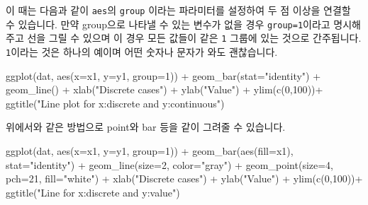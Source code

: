 \documentclass[
]{book}
\newenvironment{Shaded}{\begin{snugshade}}{\end{snugshade}}
\newcommand{\AttributeTok}[1]{\textcolor[rgb]{0.77,0.63,0.00}{#1}}
\newcommand{\DecValTok}[1]{\textcolor[rgb]{0.00,0.00,0.81}{#1}}
\newcommand{\FunctionTok}[1]{\textcolor[rgb]{0.00,0.00,0.00}{#1}}
\newcommand{\NormalTok}[1]{#1}
\newcommand{\SpecialCharTok}[1]{\textcolor[rgb]{0.00,0.00,0.00}{#1}}
\newcommand{\StringTok}[1]{\textcolor[rgb]{0.31,0.60,0.02}{#1}}
\begin{document}
이 때는 다음과 같이 \texttt{aes}의 \texttt{group} 이라는 파라미터를 설정하여 두 점 이상을 연결할 수 있습니다. 만약 group으로 나타낼 수 있는 변수가 없을 경우 \texttt{group=1}이라고 명시해 주고 선을 그릴 수 있으며 이 경우 모든 값들이 같은 \texttt{1} 그룹에 있는 것으로 간주됩니다. \texttt{1}이라는 것은 하나의 예이며 어떤 숫자나 문자가 와도 괜찮습니다.

\begin{Shaded}
\begin{Highlighting}[]
\FunctionTok{ggplot}\NormalTok{(dat, }\FunctionTok{aes}\NormalTok{(}\AttributeTok{x=}\NormalTok{x1, }\AttributeTok{y=}\NormalTok{y1, }\AttributeTok{group=}\DecValTok{1}\NormalTok{)) }\SpecialCharTok{+}
  \FunctionTok{geom\_bar}\NormalTok{(}\AttributeTok{stat=}\StringTok{"identity"}\NormalTok{) }\SpecialCharTok{+}
  \FunctionTok{geom\_line}\NormalTok{() }\SpecialCharTok{+}
  \FunctionTok{xlab}\NormalTok{(}\StringTok{"Discrete cases"}\NormalTok{) }\SpecialCharTok{+} \FunctionTok{ylab}\NormalTok{(}\StringTok{"Value"}\NormalTok{) }\SpecialCharTok{+}
  \FunctionTok{ylim}\NormalTok{(}\FunctionTok{c}\NormalTok{(}\DecValTok{0}\NormalTok{,}\DecValTok{100}\NormalTok{))}\SpecialCharTok{+}
  \FunctionTok{ggtitle}\NormalTok{(}\StringTok{"Line plot for x:discrete and y:continuous"}\NormalTok{)}
\end{Highlighting}
\end{Shaded}

위에서와 같은 방법으로 point와 bar 등을 같이 그려줄 수 있습니다.

\begin{Shaded}
\begin{Highlighting}[]
\FunctionTok{ggplot}\NormalTok{(dat, }\FunctionTok{aes}\NormalTok{(}\AttributeTok{x=}\NormalTok{x1, }\AttributeTok{y=}\NormalTok{y1, }\AttributeTok{group=}\DecValTok{1}\NormalTok{)) }\SpecialCharTok{+}
  \FunctionTok{geom\_bar}\NormalTok{(}\FunctionTok{aes}\NormalTok{(}\AttributeTok{fill=}\NormalTok{x1), }\AttributeTok{stat=}\StringTok{"identity"}\NormalTok{) }\SpecialCharTok{+}
  \FunctionTok{geom\_line}\NormalTok{(}\AttributeTok{size=}\DecValTok{2}\NormalTok{, }\AttributeTok{color=}\StringTok{"gray"}\NormalTok{) }\SpecialCharTok{+}
  \FunctionTok{geom\_point}\NormalTok{(}\AttributeTok{size=}\DecValTok{4}\NormalTok{, }\AttributeTok{pch=}\DecValTok{21}\NormalTok{, }\AttributeTok{fill=}\StringTok{"white"}\NormalTok{) }\SpecialCharTok{+}
  \FunctionTok{xlab}\NormalTok{(}\StringTok{"Discrete cases"}\NormalTok{) }\SpecialCharTok{+} \FunctionTok{ylab}\NormalTok{(}\StringTok{"Value"}\NormalTok{) }\SpecialCharTok{+}
  \FunctionTok{ylim}\NormalTok{(}\FunctionTok{c}\NormalTok{(}\DecValTok{0}\NormalTok{,}\DecValTok{100}\NormalTok{))}\SpecialCharTok{+}
  \FunctionTok{ggtitle}\NormalTok{(}\StringTok{"Line for x:discrete and y:value"}\NormalTok{)}
\end{Highlighting}
\end{Shaded}
\end{document}
